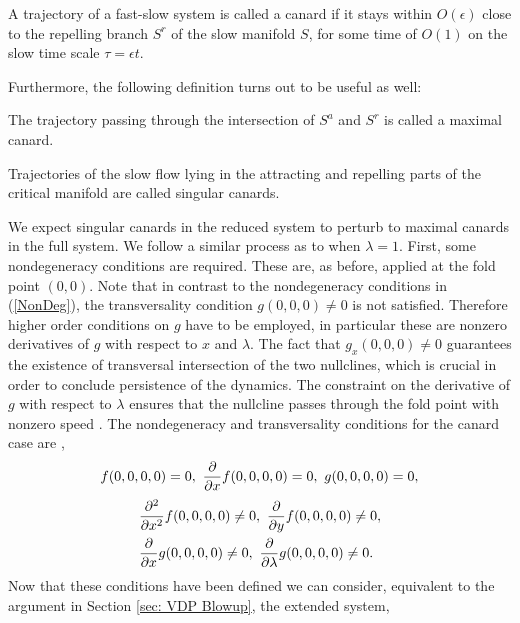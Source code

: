 \begin{definition}
A trajectory of a fast-slow system is called a canard if it stays within $O(\epsilon)$ close to the repelling branch $S^r$ of the slow manifold $S$, for some time of $O(1)$ on the slow time scale $\tau = \epsilon t$.
\end{definition}
Furthermore, the following definition turns out to be useful as well:
\begin{definition} \label{maxcanard}
The trajectory passing through the intersection of $S^a$ and $S^r$ is called a maximal canard. 
\end{definition}
\begin{definition}
	Trajectories of the slow flow lying in the attracting and repelling parts of the critical manifold are called singular canards.
\end{definition}
We expect singular canards in the reduced system to perturb to maximal canards in the full system. We follow a similar process as to when $\lambda=1$. First, some nondegeneracy conditions are required. These are, as before, applied at the fold point $(0,0)$. Note that in contrast to the nondegeneracy conditions in (\ref{NonDeg}), the transversality condition $g(0,0,0) \neq 0$ is not satisfied. Therefore higher order conditions on $g$ have to be employed, in particular these are nonzero derivatives of $g$ with respect to $x$ and $\lambda$. The fact that $g_x(0,0,0) \neq 0$ guarantees the existence of transversal intersection of the two nullclines, which is crucial in order to conclude persistence of the dynamics. The constraint on the derivative of $g$ with respect to $\lambda$ ensures that the nullcline passes through the fold point with nonzero speed \citep{Kuehn}. The nondegeneracy and transversality conditions for the canard case are  \citep{krupa2001},
\begin{equation}
f(0,0,0,0)=0, \ \pd{}{x}f(0,0,0,0)=0, \ g(0,0,0,0)=0, \label{eq: canard sing condition}
\end{equation}
\begin{equation}
\begin{aligned}
&\pd{^2}{x^2}f(0,0,0,0)\neq 0, \ \pd{}{y}f(0,0,0,0)\neq 0,\\
&\pd{}{x}g(0,0,0,0)\neq 0, \ \pd{}{\lambda}g(0,0,0,0)\neq 0. \label{eq: canard non-d condition}
\end{aligned}
\end{equation}
Now that these conditions have been defined we can consider, equivalent to the argument in Section \ref{sec: VDP Blowup}, the extended \vdp system,
